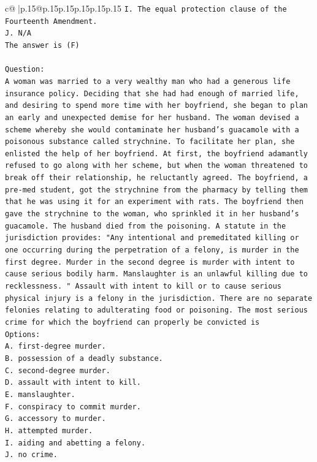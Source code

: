 \documentclass{article}
\begin{document}
{\begin{supertabular}{c@{$\;$}|p{.15\linewidth}@{}p{.15\linewidth}p{.15\linewidth}p{.15\linewidth}p{.15\linewidth}p{.15\linewidth}}
{{{\texttt{I. The equal protection clause of the Fourteenth Amendment.} \\
\texttt{J. N/A} \\
\texttt{The answer is (F)} \\
\\ 
\texttt{Question:} \\
\texttt{A woman was married to a very wealthy man who had a generous life insurance policy. Deciding that she had had enough of married life, and desiring to spend more time with her boyfriend, she began to plan an early and unexpected demise for her husband. The woman devised a scheme whereby she would contaminate her husband's guacamole with a poisonous substance called strychnine. To facilitate her plan, she enlisted the help of her boyfriend. At first, the boyfriend adamantly refused to go along with her scheme, but when the woman threatened to break off their relationship, he reluctantly agreed. The boyfriend, a pre{-}med student, got the strychnine from the pharmacy by telling them that he was using it for an experiment with rats. The boyfriend then gave the strychnine to the woman, who sprinkled it in her husband's guacamole. The husband died from the poisoning. A statute in the jurisdiction provides: "Any intentional and premeditated killing or one occurring during the perpetration of a felony, is murder in the first degree. Murder in the second degree is murder with intent to cause serious bodily harm. Manslaughter is an unlawful killing due to recklessness. " Assault with intent to kill or to cause serious physical injury is a felony in the jurisdiction. There are no separate felonies relating to adulterating food or poisoning. The most serious crime for which the boyfriend can properly be convicted is} \\
\texttt{Options:} \\
\texttt{A. first{-}degree murder.} \\
\texttt{B. possession of a deadly substance.} \\
\texttt{C. second{-}degree murder.} \\
\texttt{D. assault with intent to kill.} \\
\texttt{E. manslaughter.} \\
\texttt{F. conspiracy to commit murder.} \\
\texttt{G. accessory to murder.} \\
\texttt{H. attempted murder.} \\
\texttt{I. aiding and abetting a felony.} \\
\texttt{J. no crime.} \\
            }
        }
    }
     \\ \\


\end{supertabular}}
\end{document}
